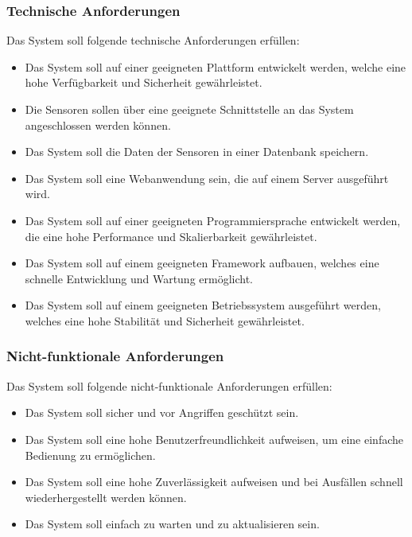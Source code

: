 		\subsubsection{Technische Anforderungen}

		Das System soll folgende technische Anforderungen erfüllen:

		\begin{itemize}
		\item Das System soll auf einer geeigneten Plattform entwickelt werden, welche eine hohe Verfügbarkeit und Sicherheit gewährleistet.
		\item Die Sensoren sollen über eine geeignete Schnittstelle an das System angeschlossen werden können.
		\item Das System soll die Daten der Sensoren in einer Datenbank speichern.
		\item Das System soll eine Webanwendung sein, die auf einem Server ausgeführt wird.
		\item Das System soll auf einer geeigneten Programmiersprache entwickelt werden, die eine hohe Performance und Skalierbarkeit gewährleistet.
		\item Das System soll auf einem geeigneten Framework aufbauen, welches eine schnelle Entwicklung und Wartung ermöglicht.
		\item Das System soll auf einem geeigneten Betriebssystem ausgeführt werden, welches eine hohe Stabilität und Sicherheit gewährleistet.
		\end{itemize}

		\subsubsection{Nicht-funktionale Anforderungen}

		Das System soll folgende nicht-funktionale Anforderungen erfüllen:

		\begin{itemize}
		\item Das System soll sicher und vor Angriffen geschützt sein.
		\item Das System soll eine hohe Benutzerfreundlichkeit aufweisen, um eine einfache Bedienung zu ermöglichen.
		\item Das System soll eine hohe Zuverlässigkeit aufweisen und bei Ausfällen schnell wiederhergestellt werden können.
		\item Das System soll einfach zu warten und zu aktualisieren sein.
		\end{itemize}

